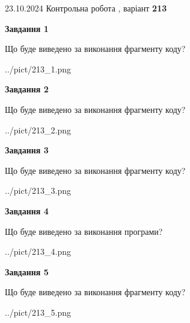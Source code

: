 \documentclass[12pt, ukrainian]{article}
\begin{document}
{\Large{23.10.2024 Контрольна робота , варіант  \No \textbf { 213 }\par}}
{
\begin {large}
{\begin {center}\textbf{Завдання 1}\end {center}}

Що буде виведено за виконання фрагменту коду?\par
\begin{center}
	{../pict/213_1.png}
\end{center}
\newpage

{\begin {center}\textbf{Завдання 2}\end {center}}

Що буде виведено за виконання фрагменту коду?\par
\begin{center}
	{../pict/213_2.png}
\end{center}
\newpage

{\begin {center}\textbf{Завдання 3}\end {center}}

Що буде виведено за виконання фрагменту коду?\par
\begin{center}
	{../pict/213_3.png}
\end{center}
\newpage

{\begin {center}\textbf{Завдання 4}\end {center}}

Що буде виведено за виконання програми?\par
\begin{center}
	{../pict/213_4.png}
\end{center}
\newpage

{\begin {center}\textbf{Завдання 5}\end {center}}

Що буде виведено за виконання фрагменту коду?\par
\begin{center}
	{../pict/213_5.png}
\end{center}
\newpage


\end{large}}
\end{document}
